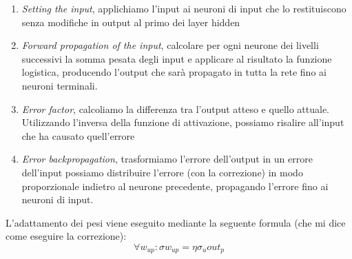 \begin{enumerate}
    \item \textit{Setting the input}, applichiamo l’input ai neuroni di input che lo restituiscono senza modifiche in output al primo dei layer hidden
    \item \textit{Forward propagation of the input}, calcolare per ogni neurone dei livelli successivi la somma pesata degli input e applicare al risultato la funzione logistica, producendo l'output che sarà propagato in tutta la rete fino ai neuroni terminali.
    \item \textit{Error factor}, calcoliamo la differenza tra l'output atteso e quello attuale. Utilizzando l'inversa della funzione di attivazione, possiamo risalire all'input che ha causato quell'errore
    \item \textit{Error backpropagation}, trasformiamo l'errore dell'output in un errore dell'input possiamo distribuire l'errore (con la correzione) in modo proporzionale indietro al neurone precedente, propagando l'errore fino ai neuroni di input.
\end{enumerate}
L'adattamento dei pesi viene eseguito mediante la seguente formula (che mi dice come eseguire la correzione):
$$\forall w_{up} : \sigma w_{up} = \eta\sigma_u out_p$$


